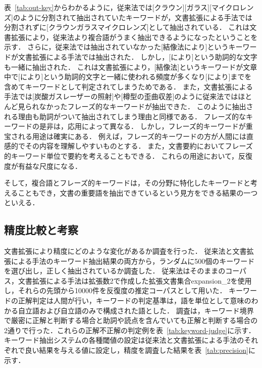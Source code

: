 \documentclass[japanese]{jnlp_1.2c}
\begin{document}
表~\ref{tab:out-key}からわかるように，従来法では[クラウン][ガラス][マイクロレンズ]のように分割されて抽出されていたキーワードが，文書拡張による手法では分割されずに[クラウンガラスマイクロレンズ]として抽出されている．
これは文書拡張により，従来法より複合語がうまく抽出できるようになったということを示す．
さらに，従来法では抽出されていなかった[結像法により]というキーワードが文書拡張による手法では抽出された．
しかし，[により]という助詞的な文字も一緒に抽出された．
これは文書拡張により，[結像法]というキーワードが文章中で[により]という助詞的文字と一緒に使われる頻度が多くなり[により]までを含めてキーワードとして判定されてしまうためである．
また，文書拡張による手法では[炭酸ガスレーザーの照射]や[樽型の歪曲収差]のように従来法ではほとんど見られなかったフレーズ的なキーワードが抽出できた．
このように抽出される理由も助詞がついて抽出されてしまう理由と同様である．
フレーズ的なキーワードの是非は，応用によって異なる．
しかし，フレーズ的キーワードが重宝される用途は確実にある．
例えば，フレーズ的キーワードの方が人間には直感的でその内容を理解しやすいものとする．
また，文書要約においてフレーズ的キーワード単位で要約を考えることもできる．
これらの用途において，反復度が有益な尺度になる．

そして，複合語とフレーズ的キーワードは，その分野に特化したキーワードと考えることもでき，文書の重要語を抽出できているという見方をできる結果の一つといえる．

\subsection{精度比較と考察}
文書拡張により精度にどのような変化があるか調査を行った．
従来法と文書拡張による手法のキーワード抽出結果の両方から，ランダムに500個のキーワードを選び出し，正しく抽出されているか調査した．
従来法はそのままのコーパス，文書拡張による手法は拡張数2で作成した拡張文書集合expansion\_2を使用し，それらの先頭から10000件を反復度の推定コーパスとして用いた．
キーワードの正解判定は人間が行い，キーワードの判定基準は，語を単位として意味のわかる自立語および自立語のみで構成された語とした．
調査は，キーワード境界で厳密に正解と判断する場合と助詞や読点を含んでいても正解と判断する場合の2通りで行った．これらの正解不正解の判定例を表~\ref{tab:keyword-judge}に示す．
キーワード抽出システムの各種閾値の設定は従来法と文書拡張による手法のそれぞれで良い結果を与える値に設定し，精度を調査した結果を表~\ref{tab:precision}に示す．
\end{document}
